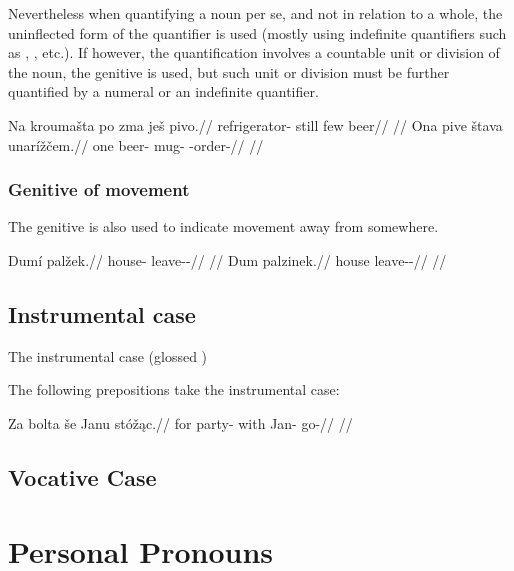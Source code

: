 Nevertheless when quantifying a noun per se, and not in relation to a whole, the uninflected form of the quantifier is used (mostly using indefinite quantifiers such as , , etc.). If however, the quantification involves a countable unit or division of the noun, the genitive is used, but such unit or division must be further quantified by a numeral or an indefinite quantifier.

\pex
\a
\begingl
\gla Na kroumašta po zma ješ pivo.//
\glb \Loc{} refrigerator-\Acc{} still few \Exst{} beer//
\glft {}//
\endgl
\a
\begingl
\gla Ona pive štava unarížčem.//
\glb one beer-\Gen{} mug-\Acc{} \Refl{}-order-//
\glft {}//
\endgl
\xe

\subsubsection{Genitive of movement}

The genitive is also used to indicate movement away from somewhere.

\pex
\a
\begingl
\gla Dumí palžek.//
\glb house-\Gen{} leave-\Av{}-\Pf{}//
\glft {}//
\endgl
\a
\begingl
\gla Dum palzinek.//
\glb house leave-\Pv{}-\Pf{}//
\glft {}//
\endgl
\xe

\subsection{Instrumental case}

The instrumental case (glossed \Ins{})

The following prepositions take the instrumental case:  

\pex
\begingl
\gla Za bolta še Janu stóž\k{a}c.//
\glb for party-\Acc{} with Jan-\Ins{} go-//
\glft {}//
\endgl
\xe


\subsection{Vocative Case}



\section{Personal Pronouns}

